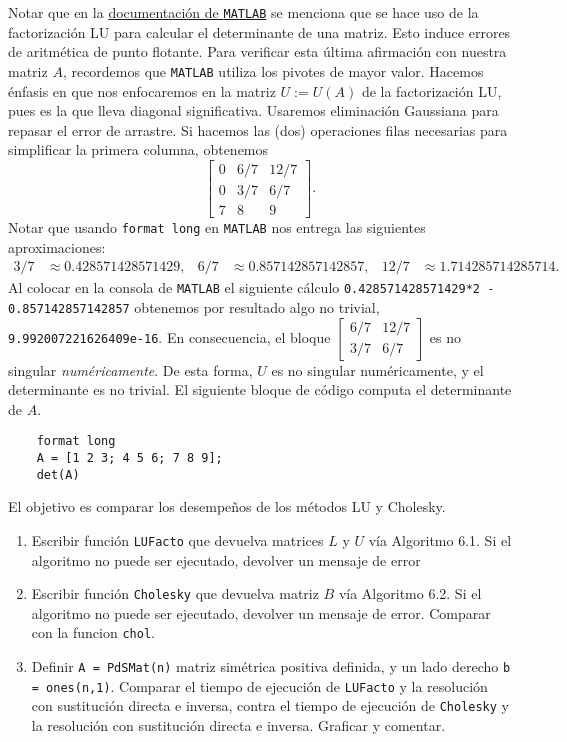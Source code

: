 Notar que en la \href{https://www.mathworks.com/help/matlab/ref/det.html#bubi9tw}{documentaci\'on de \texttt{MATLAB}} se menciona que se hace uso de la factorizaci\'on LU para calcular el determinante de una matriz. Esto induce errores de aritm\'etica de punto flotante. Para verificar esta \'ultima afirmaci\'on con nuestra matriz \(A\), recordemos que \texttt{MATLAB} utiliza los pivotes de mayor valor. Hacemos \'enfasis en que nos enfocaremos en la matriz \(U:=U(A)\) de la factorizaci\'on LU, pues es la que lleva diagonal significativa. Usaremos eliminaci\'on Gaussiana para repasar el error de arrastre. Si hacemos las (dos) operaciones filas necesarias para simplificar la primera columna, obtenemos
\[
    \begin{bmatrix}0 & 6/7 & 12/7\\ 0 & 3/7 & 6/7\\ 7 & 8 & 9\end{bmatrix}.
\]
Notar que usando \texttt{format long} en \texttt{MATLAB} nos entrega las siguientes aproximaciones:
\begin{align*}
    3/7 & \approx 0.428571428571429, & 6/7 & \approx 0.857142857142857, & 12/7 & \approx 1.714285714285714.
\end{align*}
Al colocar en la consola de \texttt{MATLAB} el siguiente c\'alculo \texttt{0.428571428571429*2 - 0.857142857142857} obtenemos por resultado algo no trivial, \texttt{9.992007221626409e-16}.
En consecuencia, el bloque \(\begin{bmatrix}6/7 & 12/7\\ 3/7 & 6/7\end{bmatrix}\) es no singular \emph{num\'ericamente}. De esta forma, \(U\) es no singular num\'ericamente, y el determinante es no trivial. El siguiente bloque de c\'odigo computa el determinante de \(A\).
\begin{verbatim}
    format long
    A = [1 2 3; 4 5 6; 7 8 9];
    det(A)
\end{verbatim}

\begin{problema}
    El  objetivo es comparar los desempe\~nos de los m\'etodos LU y Cholesky.
    \begin{enumerate}
        \item Escribir funci\'on \texttt{LUFacto} que devuelva matrices \(L\) y \(U\) v\'ia Algoritmo 6.1. Si el algoritmo no puede ser ejecutado, devolver un mensaje de error
        \item Escribir funci\'on \texttt{Cholesky} que devuelva matriz \(B\) v\'ia Algoritmo 6.2. Si el algoritmo no puede ser ejecutado, devolver un mensaje de error. Comparar con la funcion \texttt{chol}.
        \item Definir \texttt{A = PdSMat(n)} matriz sim\'etrica positiva definida, y un lado derecho \texttt{b = ones(n,1)}. Comparar el tiempo de ejecuci\'on de \texttt{LUFacto} y la resoluci\'on con sustituci\'on directa e inversa, contra el tiempo de ejecuci\'on de \texttt{Cholesky} y la resoluci\'on con sustituci\'on directa e inversa. Graficar y comentar.
    \end{enumerate}
\end{problema}

